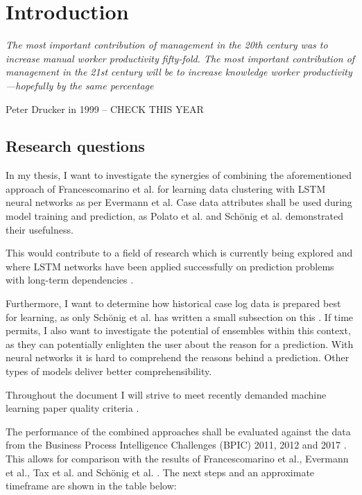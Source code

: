 \chapter{Introduction}\label{sec:intro}
\setlength{\epigraphwidth}{0.9\textwidth}
\renewcommand{\epigraphrule}{0pt}
\epigraph{\textit{The most important contribution of management in the 20th century was to increase manual worker productivity fifty-fold. The most important contribution of management in the 21st century will be to increase knowledge worker productivity—hopefully by the same percentage}}{Peter Drucker in 1999 -- CHECK THIS YEAR}

\lipsum[1-4]

\section{Research questions}\label{sec:intro:objective}
In my thesis, I want to investigate the synergies of combining the aforementioned approach of Francescomarino et al. for learning data clustering with LSTM neural networks as per Evermann et al. Case data attributes shall be used during model training and prediction, as Polato et al. \cite{polato2014} and Schönig et al. \cite{schoenig2018} demonstrated their usefulness.

This would contribute to a field of research which is currently being explored and where LSTM networks have been applied successfully on prediction problems with long-term dependencies \cite{evermann2016, tax2017, schoenig2018, graves2005}.

Furthermore, I want to determine how historical case log data is prepared best for learning, as only Schönig et al. has written a small subsection on this \cite{schoenig2018}.
If time permits, I also want to investigate the potential of ensembles within this context, as they can potentially enlighten the user about the reason for a prediction.
With neural networks it is hard to comprehend the reasons behind a prediction.
Other types of models deliver better comprehensibility.

Throughout the document I will strive to meet recently demanded machine learning paper quality criteria \cite{lipton2018}.

The performance of the combined approaches shall be evaluated against the data from the Business Process Intelligence Challenges (BPIC) 2011, 2012 and 2017 \cite{BPIC2011, BPIC2012, BPIC2017}. This allows for comparison with the results of Francescomarino et al., Evermann et al., Tax et al. and Schönig et al. \cite{francescomarino2018, evermann2016, tax2017, schoenig2018}.
The next steps and an approximate timeframe are shown in the table below:\\[1em]

